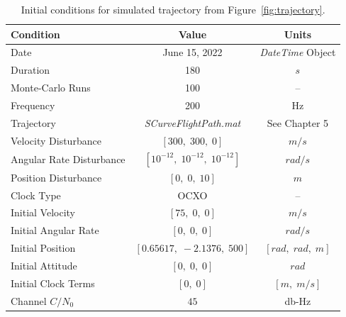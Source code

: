 \begin{table}[!ht]
    \caption{Initial conditions for simulated trajectory from Figure~\ref{fig:trajectory}.}\label{tbl:trajectory}
    \centering
    \begin{tabular}{lcc}
        \toprule
        \textbf{Condition}       & \textbf{Value}                                      & \textbf{Units}                     \\
        \midrule
        Date                     & June 15, 2022                                       & \textit{DateTime} Object           \\
        Duration                 & 180                                                 & \(s\)                              \\
        Monte-Carlo Runs         & 100                                                 & {--}                               \\
        Frequency                & 200                                                 & Hz                                 \\
        Trajectory               & \textit{SCurveFlightPath.mat}                       & See Chapter 5                      \\
        Velocity Disturbance     & \(\left[300, \; 300, \; 0\right]\)                  & \(m/s\)                            \\
        Angular Rate Disturbance & \(\left[10^{-12}, \; 10^{-12}, \; 10^{-12}\right]\) & \(rad/s\)                          \\
        Position Disturbance     & \(\left[0, \; 0, \; 10\right]\)                     & \(m\)                              \\
        Clock Type               & OCXO                                                & {--}                               \\
        Initial Velocity         & \(\left[75, \; 0, \; 0\right]\)                     & \(m/s\)                            \\
        Initial Angular Rate     & \(\left[0, \; 0, \; 0\right]\)                      & \(rad/s\)                          \\
        Initial Position         & \(\left[0.65617, \; -2.1376, \; 500\right]\)        & \(\left[rad, \; rad, \; m\right]\) \\
        Initial Attitude         & \(\left[0, \; 0, \; 0\right]\)                      & \(rad\)                            \\
        Initial Clock Terms      & \(\left[0, \; 0\right]\)                            & \(\left[m, \; m/s\right]\)         \\
        Channel \(C/N_0\)        & \(45\)                                              & db-Hz                              \\

        \bottomrule
    \end{tabular}
\end{table}

